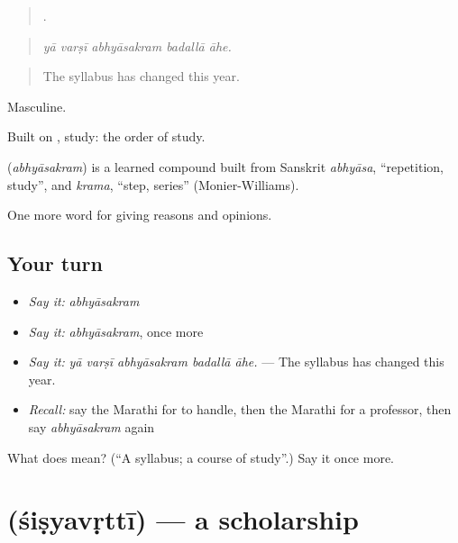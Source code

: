 \begin{quote}
    .
\end{quote}

\begin{quote}
\emph{yā varṣī abhyāsakram badallā āhe.}
\end{quote}

\begin{quote}
The syllabus has changed this year.
\end{quote}

Masculine.

Built on , study: the order of study.

\begin{cousinweb}
\textbf{} (\emph{abhyāsakram}) is a learned compound built from Sanskrit \emph{abhyāsa}, \textquotedblleft{}repetition, study\textquotedblright{}, and \emph{krama}, \textquotedblleft{}step, series\textquotedblright{} (Monier-Williams).
\end{cousinweb}

\begin{grammarlens}[title={What you've built}]
One more word for giving reasons and opinions.
\end{grammarlens}

\subsection*{Your turn}
\begin{itemize}
\raggedright
  \item \emph{Say it:} \emph{abhyāsakram}
  \item \emph{Say it:} \emph{abhyāsakram}, once more
  \item \emph{Say it:} \emph{yā varṣī abhyāsakram badallā āhe.} — The syllabus has changed this year.
  \item \emph{Recall:} say the Marathi for to handle, then the Marathi for a professor, then say \emph{abhyāsakram} again
\end{itemize}

\begin{tcolorbox}[breakable,colback=teal!4,colframe=teal!35!black,title={Before you move on}]
What does  mean? (\textquotedblleft{}A syllabus; a course of study\textquotedblright{}.) Say it once more.
\end{tcolorbox}
\section[\texorpdfstring{\mr{शिष्यवृत्ती} (śiṣyavṛttī)}{शिष्यवृत्ती (śiṣyavṛttī)}]{ (śiṣyavṛttī) — a scholarship}

